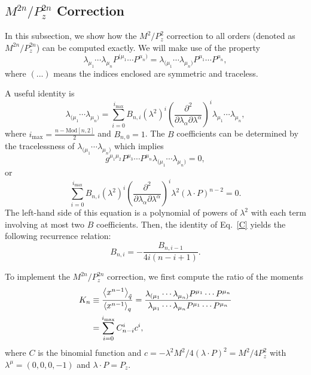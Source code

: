 \subsection{$M^{2n}/P_z^{2n}$ Correction}

In this subsection, we show how the $M^2/P_z^2$ correction to all
orders (denoted as $M^{2n}/P_z^{2n}$) can be computed exactly. We will
make use of the property
%
\begin{equation}
\lambda_{\mu_1}\cdots \lambda_{\mu_n} P^{(\mu_1}\cdots P^{\mu_n)} =
  \lambda_{(\mu_1}\cdots \lambda_{\mu_n)} P^{\mu_1}\cdots P^{\mu_n},
\end{equation}
%
where $(...)$ means the indices enclosed are symmetric and traceless.

A useful identity is
%
\begin{equation}
\lambda_{(\mu_1}\cdots \lambda_{\mu_n)} =
  \sum_{i=0}^{i_\text{max}} B_{n,i} \left(\lambda^2\right)^i
    \left(\frac{\partial^2}{\partial\lambda_\alpha \partial\lambda^\alpha}\right)^i
    \lambda_{\mu_1}\cdots \lambda_{\mu_n},  \label{a1}
\end{equation}
%
where $i_\text{max}=\frac{n-\text{Mod}[n,2]}{2}$ and $B_{n,0}=1$.
The $B$ coefficients can be determined by the tracelessness of
$\lambda_{(\mu_1}\cdots \lambda_{\mu_n)}$ which implies
%
\begin{equation}
g^{\mu_1 \mu_2}P^{\mu_3}\cdots P^{\mu_n}
  \lambda_{(\mu_1}\cdots \lambda_{\mu_n)} = 0,
\end{equation}
%
or
%
\begin{equation}
\sum_{i=0}^{i_\text{max}} B_{n,i} \left(\lambda^2\right)^i
  \left(\frac{\partial^2}{\partial\lambda_\alpha \partial\lambda^\alpha}\right)^i
  \lambda^2 \left(\lambda \cdot P\right)^{n-2} = 0.  \label{C}
\end{equation}
%
The left-hand side of this equation is a polynomial of powers of $\lambda^2$
with each term involving at most two $B$ coefficients. Then, the identity of
Eq.~\ref{C} yields the following recurrence relation:
%
\begin{equation}
B_{n,i} = -\frac{B_{n,i-1}}{4i(n-i+1)}.  \label{a3}
\end{equation}

To implement the $M^{2n}/P_z^{2n}$ correction, we first compute the ratio of the moments 
%
\begin{align}
K_n  &\equiv\frac{\left\langle x^{n-1}\right\rangle_{\tilde q}}{\left\langle x^{n-1}\right\rangle_q}=\frac{\lambda_{(\mu_1}\cdots \lambda_{\mu_n)}
  P^{\mu_1}\cdots P^{\mu_n}}{\lambda_{\mu_1}\cdots \lambda_{\mu_n}
  P^{\mu_1}\cdots P^{\mu_n}}  \notag \\
&= \sum_{i=0}^{i_\text{max}} C_{n-i}^i c^i   \label{Kn},
\end{align}
%
where $C$ is the binomial function and
$c=-\lambda^2 M^2/4\left(\lambda\cdot P\right)^2 = M^2/4 P_z^2$
with $\lambda^\mu = (0,0,0,-1)$ and $\lambda \cdot P=P_z$. 

